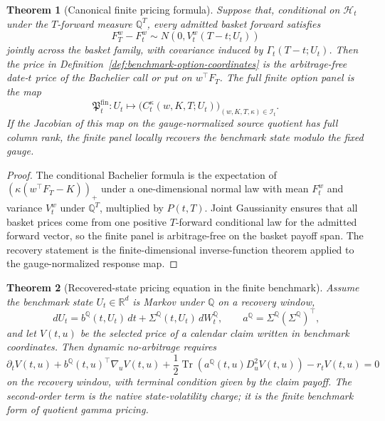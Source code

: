 \documentclass[11pt,a4paper]{amsart}
\theoremstyle{plain}
\newtheorem{theorem}{Theorem}[section]
\theoremstyle{definition}
\theoremstyle{remark}
\newcommand{\R}{\mathbb{R}}
\newcommand{\QQ}{\mathbb{Q}}
\newcommand{\cH}{\mathcal{H}}
\newcommand{\dd}{\,d}
\begin{document}
\begin{theorem}[Canonical finite pricing formula]\label{thm:canonical-finite-pricing}
Suppose that, conditional on \(\cH_t\) under the \(T\)-forward measure \(\QQ^T\), every admitted
basket forward satisfies
\[
        F_{T}^{w}-F_t^w
        \sim
        N\!\left(0,V_t^w(T-t;U_t)\right)
\]
jointly across the basket family, with covariance induced by
\(\Gamma_t(T-t;U_t)\).  Then the price in
Definition~\ref{def:benchmark-option-coordinates} is the arbitrage-free date-\(t\) price of the
Bachelier call or put on \(w^\top F_T\).  The full finite option panel is the map
\[
        \mathfrak P_t^{\mathrm{fin}}:
        U_t
        \longmapsto
        \bigl(C_t^\kappa(w,K,T;U_t)\bigr)_{(w,K,T,\kappa)\in\mathcal I_t}.
\]
If the Jacobian of this map on the gauge-normalized source quotient has full column rank, the
finite panel locally recovers the benchmark state modulo the fixed gauge.
\end{theorem}

\begin{proof}
The conditional Bachelier formula is the expectation of
\((\kappa(w^\top F_T-K))_+\) under a one-dimensional normal law with mean \(F_t^w\) and variance
\(V_t^w\) under \(\QQ^T\), multiplied by \(P(t,T)\).  Joint Gaussianity ensures that all basket
prices come from one positive \(T\)-forward conditional law for the admitted forward vector, so
the finite panel is arbitrage-free on the basket payoff span.  The recovery statement is the
finite-dimensional inverse-function theorem applied to the gauge-normalized response map.
\end{proof}

\begin{theorem}[Recovered-state pricing equation in the finite benchmark]\label{thm:finite-benchmark-pde}
Assume the benchmark state \(U_t\in\R^d\) is Markov under \(\QQ\) on a recovery window,
\[
        \dd U_t=b^\QQ(t,U_t)\dd t+\Sigma^\QQ(t,U_t)\dd W_t^\QQ,
        \qquad
        a^\QQ=\Sigma^\QQ(\Sigma^\QQ)^\top,
\]
and let \(V(t,u)\) be the selected price of a calendar claim written in benchmark coordinates.
Then dynamic no-arbitrage requires
\[
        \partial_tV(t,u)
        +
        b^\QQ(t,u)^\top\nabla_u V(t,u)
        +
        \frac12
        \operatorname{Tr}\!\left(a^\QQ(t,u)D_u^2V(t,u)\right)
        -
        r_tV(t,u)
        =
        0
\]
on the recovery window, with terminal condition given by the claim payoff.  The second-order term
is the native state-volatility charge; it is the finite benchmark form of quotient gamma pricing.
\end{theorem}
\end{document}
